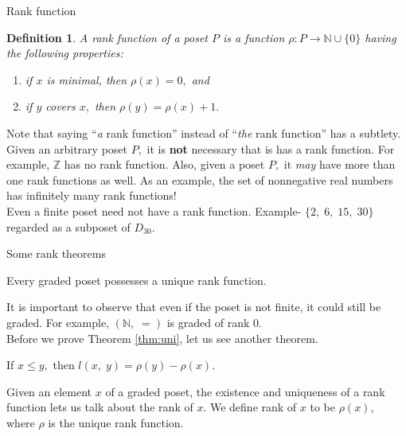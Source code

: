\documentclass[handout, aspectratio=169]{beamer}
\newtheorem{defn}{Definition}
\begin{document}
\begin{frame}{Rank function}
	\begin{defn}
		A rank function of a poset $P$ is a function $\rho:P \to \mathbb{N}\cup\{0\}$ having the following properties:
		\begin{enumerate} 
			\item if $x$ is minimal, then $\rho(x) = 0,$ and
			\item if $y$ covers $x,$ then $\rho(y) = \rho(x) + 1.$
		\end{enumerate}
	\end{defn}
%
	Note that saying ``\emph{a} rank function'' instead of ``\emph{the} rank function'' has a subtlety.\\
	Given an arbitrary poset $P,$ it is \textbf{not} necessary that is has a rank function. For example, $\mathbb{Z}$ has no rank function. Also, given a poset $P,$ it \emph{may} have more than one rank functions as well. As an example, the set of nonnegative real numbers has infinitely many rank functions!\\
	Even a finite poset need not have a rank function. Example- $\{2,\;6,\;15,\;30\}$ regarded as a subposet of $D_{30}.$
\end{frame}
\begin{frame}{Some rank theorems}
	\begin{theorem}\label{thm:uni}
		Every graded poset possesses a unique rank function.
	\end{theorem}
	It is important to observe that even if the poset is not finite, it could still be graded. For example, $(\mathbb{N}, \; =)$ is graded of rank $0.$\\
	Before we prove Theorem \ref{thm:uni}, let us see another theorem.\\
	\begin{theorem}\label{thm:intlen}
		If $x \le y,$ then $l(x,\;y) = \rho(y) - \rho(x).$
	\end{theorem}
	Given an element $x$ of a graded poset, the existence and uniqueness of a rank function lets us talk about the rank of $x.$ We define rank of $x$ to be $\rho(x),$ where $\rho$ is the unique rank function.
\end{frame}
\end{document}
